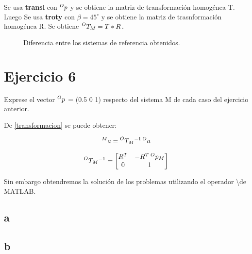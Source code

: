 \documentclass[a4paper,12pt]{article}
\begin{document}
Se usa \textbf{transl} con $\prescript{O}{}{p}$ y se obtiene la matriz de transformación homogénea T.
Luego Se usa \textbf{troty} con $\beta = 45^\circ$ y se obtiene la matriz de trasnformación homogénea R.
Se obtiene $\prescript{O}{}{T_M} = T*R$.

\begin{figure}[H]
    \centering
    \begin{adjustbox}{scale = 0.85, max width=\columnwidth}
    \end{adjustbox}
    \caption{Diferencia entre los sistemas de referencia obtenidos.}
\end{figure}

\section{Ejercicio 6}
Exprese el vector $\prescript{O}{}{p}$ = (0.5 0 1) respecto del sistema {M} de cada caso del
ejercicio anterior.

De \cref{transformacion} se puede obtener:

\begin{equation}
    \prescript{M}{}{a} = \prescript{O}{}{T_M}^{-1}\prescript{O}{}{a}
    \label{transformacion inversa}
\end{equation}

\begin{equation}
    \prescript{O}{}{T_M}^{-1} =
    \begin{bmatrix}
        R^T & -R^T\prescript{O}{}{p_M}\\
        0   &   1
    \end{bmatrix}
    \label{matriz homogenea inversa}
\end{equation}

Sin embargo obtendremos la solución de los problemas utilizando el operador \textbackslash de MATLAB.

\subsection{a}

\subsection{b}
\end{document}
